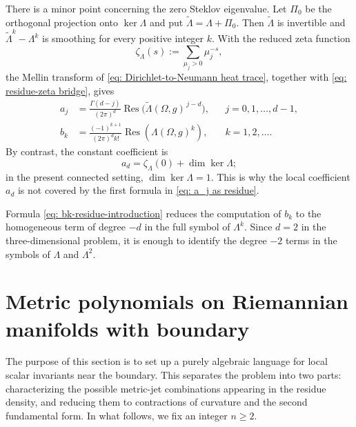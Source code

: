 \documentclass[11pt]{amsart}
\newcommand*{\Res}{\operatorname{Res}}
\theoremstyle{definition}
\numberwithin{equation}{section}
\begin{document}
	
	There is a minor point concerning the zero Steklov eigenvalue.  Let $\Pi_0$ be the orthogonal projection onto $\ker\Lambda$ and put $\widetilde\Lambda=\Lambda+\Pi_0$.  Then $\widetilde\Lambda$ is invertible and $\widetilde\Lambda^k-\Lambda^k$ is smoothing for every positive integer $k$. With the reduced zeta function
	\[ \zeta_\Lambda(s):=\sum_{\mu_j>0}\mu_j^{-s}, \]
	the Mellin transform of \eqref{eq: Dirichlet-to-Neumann heat trace}, together with \eqref{eq: residue-zeta bridge}, gives \cite{wodzickiNoncommutativeResidueFundamentals1987}
	\begin{align}
		\label{eq: a_j as residue}
		a_j	&=\frac{\Gamma(d-j)}{(2\pi)^d}
		\Res\bigl(\widetilde\Lambda(\Omega,g)^{\,j-d}\bigr), 	&&j=0,1,\ldots,d-1,\\
		\label{eq: bk-residue-introduction}
		b_k	&=\frac{(-1)^{k+1}}{(2\pi)^d k!}\Res(\Lambda(\Omega,g)^k), 	&&k=1,2,\ldots.
	\end{align}
	By contrast, the constant coefficient is \cite{seeleyComplexPowersElliptic1967}
	\[a_d=\zeta_\Lambda(0)+\dim\ker\Lambda;\]
	in the present connected setting, $\dim\ker\Lambda=1$.  This is why the local coefficient $a_d$ is not covered by the first formula in \eqref{eq: a_j as residue}.
	
	
	Formula \eqref{eq: bk-residue-introduction} reduces the computation of $b_k$
	to the homogeneous term of degree $-d$ in the full symbol of $\Lambda^k$.
	Since $d=2$ in the three-dimensional problem, it is enough to identify the
	degree $-2$ terms in the symbols of $\Lambda$ and $\Lambda^2$.   
	
	 
	
\section{Metric polynomials on Riemannian manifolds with boundary}
\label{sec:metricpolyn}

The purpose of this section is to set up a purely algebraic language for local scalar invariants near the boundary. This separates the problem into two parts: characterizing the possible metric-jet combinations appearing in the residue density, and reducing them to contractions of curvature and the second fundamental form. In what follows, we fix an integer $n\ge2$.
\end{document}
